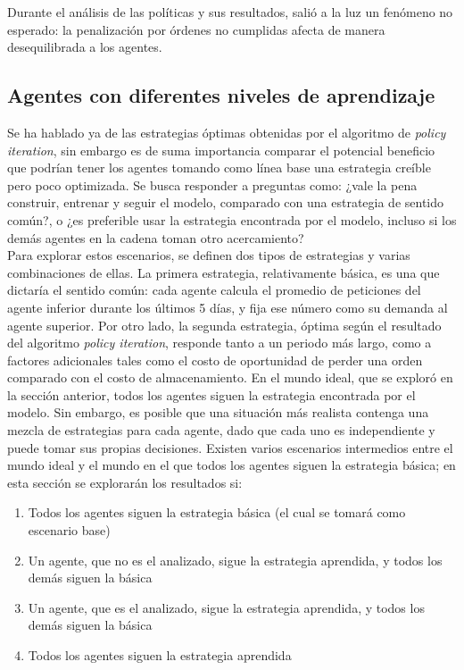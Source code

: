 Durante el an\'alisis de las pol\'iticas y sus resultados, sali\'o a la luz un fen\'omeno no esperado: la penalizaci\'on por \'ordenes no cumplidas afecta de manera desequilibrada a los agentes.\\

\subsection{Agentes con diferentes niveles de aprendizaje}

Se ha hablado ya de las estrategias \'optimas obtenidas por el algoritmo de \textit{policy iteration}, sin embargo es de suma importancia comparar el potencial beneficio que podr\'ian tener los agentes tomando como l\'inea base una estrategia cre\'ible pero poco optimizada. Se busca responder a preguntas como: ¿vale la pena construir, entrenar y seguir el modelo, comparado con una estrategia de sentido com\'un?, o ¿es preferible usar la estrategia encontrada por el modelo, incluso si los dem\'as agentes en la cadena toman otro acercamiento?\\

 Para explorar estos escenarios, se definen dos tipos de estrategias y varias combinaciones de ellas. La primera estrategia, relativamente b\'asica, es una que dictar\'ia el sentido com\'un: cada agente calcula el promedio de peticiones del agente inferior durante los \'ultimos 5 d\'ias, y fija ese n\'umero como su demanda al agente superior. Por otro lado, la segunda estrategia, \'optima seg\'un el resultado del algoritmo \textit{policy iteration}, responde tanto a un periodo m\'as largo, como a factores adicionales tales como el costo de oportunidad de perder una orden comparado con el costo de almacenamiento. En el mundo ideal, que se explor\'o en la secci\'on anterior, todos los agentes siguen la estrategia encontrada por el modelo. Sin embargo, es posible que una situaci\'on m\'as realista contenga una mezcla de estrategias para cada agente, dado que cada uno es independiente y puede tomar sus propias decisiones. Existen varios escenarios intermedios entre el mundo ideal y el mundo en el que todos los agentes siguen la estrategia b\'asica; en esta secci\'on se explorar\'an los resultados si:\\
 
 \begin{enumerate}
     \item Todos los agentes siguen la estrategia b\'asica (el cual se tomar\'a como escenario base)
     \item Un agente, que no es el analizado, sigue la estrategia aprendida, y todos los dem\'as siguen la b\'asica
     \item Un agente, que es el analizado, sigue la estrategia aprendida, y todos los dem\'as siguen la b\'asica
     \item Todos los agentes siguen la estrategia aprendida
 \end{enumerate}

